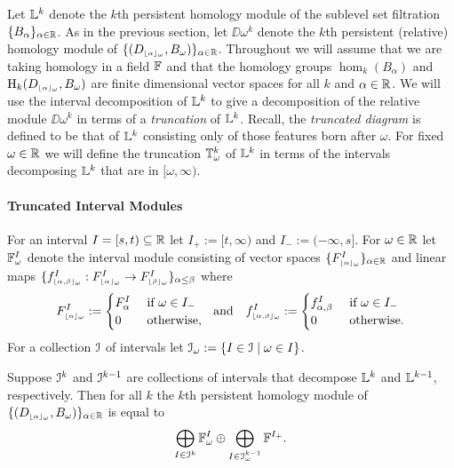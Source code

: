 Let $\mathbb{L}^k$ denote the $k$th persistent homology module of the sublevel set filtration $\{B_\alpha\}_{\alpha\in\mathbb{R}}$.
As in the previous section, let $\DD{\omega}^k$ denote the $k$th persistent (relative) homology module of $\{(D_{\scriptscriptstyle \lfloor\alpha\rfloor_{\omega}}, B_\omega)\}_{\alpha\in\mathbb{R}}$.
Throughout we will assume that we are taking homology in a field $\mathbb{F}$ and that the homology groups $\hom_k(B_\alpha)$ and $\mathrm{H}_k(D_{\scriptscriptstyle \lfloor\alpha\rfloor_{\omega}}, B_\omega)$ are finite dimensional vector spaces for all $k$ and $\alpha\in\mathbb{R}$.
We will use the interval decomposition of $\mathbb{L}^k$ to give a decomposition of the relative module $\DD{\omega}^k$ in terms of a \emph{truncation} of $\mathbb{L}^k$.
Recall, the \emph{truncated diagram} is defined to be that of $\mathbb{L}^k$ consisting only of those features born after $\omega$.
For fixed $\omega\in\mathbb{R}$ we will define the truncation $\mathbb{T}^k_\omega$ of $\mathbb{L}^k$ in terms of the intervals decomposing $\mathbb{L}^k$ that are in $[\omega, \infty)$.

\paragraph*{Truncated Interval Modules}

For an interval $I = [s,t)\subseteq \mathbb{R}$ let $I_+ := [t,\infty)$ and $I_- := (-\infty, s]$.
For $\omega\in\mathbb{R}$ let $\mathbb{F}_{\omega}^I$ denote the interval module consisting of vector spaces $\{F_{\scriptscriptstyle \lfloor\alpha\rfloor_{\omega}}^I\}_{\alpha\in\mathbb{R}}$ and linear maps $\{f_{\scriptscriptstyle \lfloor\alpha,\beta\rfloor_{\omega}}^I : F_{\scriptscriptstyle \lfloor\alpha\rfloor_{\omega}}^I\to F_{\scriptscriptstyle \lfloor\beta\rfloor_{\omega}}^I\}_{\alpha\leq\beta}$ where
\[ F_{\scriptscriptstyle \lfloor\alpha\rfloor_{\omega}}^I := \begin{cases} F_\alpha^I&\text{ if } \omega\in I_-\\ 0&\text{ otherwise,}\end{cases}\ \text{ and }\ \ f_{\scriptscriptstyle \lfloor\alpha,\beta\rfloor_{\omega}}^I := \begin{cases} f_{\alpha,\beta}^I&\text{ if } \omega\in I_-\\ 0&\text{ otherwise.}\end{cases}\]
For a collection $\mathcal{I}$ of intervals let $\mathcal{I}_\omega := \{I\in\mathcal{I}\mid \omega\in I\}$.

\begin{lemma}\label{lem:decomposition}
  Suppose $\mathcal{I}^k$ and $\mathcal{I}^{k-1}$ are collections of intervals that decompose $\mathbb{L}^k$ and $\mathbb{L}^{k-1}$, respectively.
  Then for all $k$ the $k$th persistent homology module of $\{(D_{\scriptscriptstyle \lfloor\alpha\rfloor_{\omega}}, B_\omega)\}_{\alpha\in\mathbb{R}}$ is equal to
  \[\bigoplus_{I\in\mathcal{I}^k} \mathbb{F}_\omega^I \oplus \bigoplus_{I\in \mathcal{I}_\omega^{k-1}} \mathbb{F}^{I_+}.\]
\end{lemma}

